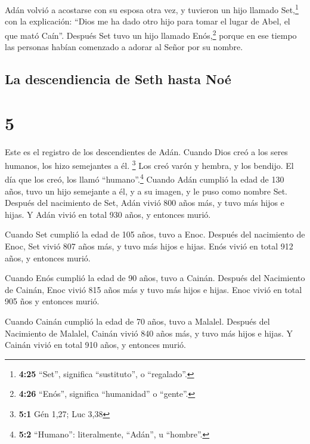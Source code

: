  Adán volvió a acostarse con su esposa otra vez, y
tuvieron un hijo llamado Set,\footnote{\textbf{4:25} ``Set'', significa
  ``sustituto'', o ``regalado''.} con la explicación: ``Dios me ha dado
otro hijo para tomar el lugar de Abel, el que mató Caín''.
 Después Set tuvo un hijo llamado Enós,\footnote{\textbf{4:26}
  ``Enós'', significa ``humanidad'' o ``gente''.} porque en ese tiempo
las personas habían comenzado a adorar al Señor por su nombre.

\hypertarget{la-descendiencia-de-seth-hasta-nouxe9}{%
\subsection{La descendiencia de Seth hasta
Noé}\label{la-descendiencia-de-seth-hasta-nouxe9}}

\hypertarget{section-4}{%
\section{5}\label{section-4}}

 Este es el registro de los descendientes de Adán. Cuando
Dios creó a los seres humanos, los hizo semejantes a él. \footnote{\textbf{5:1}
  Gén 1,27; Luc 3,38}  Los creó varón y hembra, y los
bendijo. El día que los creó, los llamó ``humano''.\footnote{\textbf{5:2}
  ``Humano'': literalmente, ``Adán'', u ``hombre''.} 
Cuando Adán cumplió la edad de 130 años, tuvo un hijo semejante a él, y
a su imagen, y le puso como nombre Set.  Después del
nacimiento de Set, Adán vivió 800 años más, y tuvo más hijos e hijas.
 Y Adán vivió en total 930 años, y entonces murió.

 Cuando Set cumplió la edad de 105 años, tuvo a Enoc.
 Después del nacimiento de Enoc, Set vivió 807 años más, y
tuvo más hijos e hijas.  Enós vivió en total 912 años, y
entonces murió.

 Cuando Enós cumplió la edad de 90 años, tuvo a Cainán.
 Después del Nacimiento de Cainán, Enoc vivió 815 años
más y tuvo más hijos e hijas.  Enoc vivió en total 905
ños y entonces murió.

 Cuando Cainán cumplió la edad de 70 años, tuvo a
Malalel.  Después del Nacimiento de Malalel, Cainán vivió
840 años más, y tuvo más hijos e hijas.  Y Cainán vivió
en total 910 años, y entonces murió.

